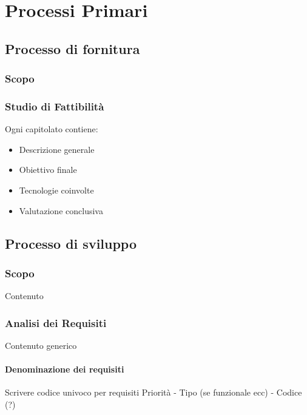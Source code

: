 \section{Processi Primari}\label{PP}

    \subsection{Processo di fornitura}\label{PP:Fornitura}	%

        \subsubsection{Scopo}\label{PP:Fornitura:Scopo}


        \subsubsection{Studio di Fattibilità}\label{PP:Fornitura:SdF} 
        	Ogni capitolato contiene:
        	\begin{itemize}
        		\item Descrizione generale
        		\item Obiettivo finale
        		\item Tecnologie coinvolte
        		\item Valutazione conclusiva
        	\end{itemize}


    \subsection{Processo di sviluppo}\label{PP:Sviluppo}

        \subsubsection{Scopo}\label{PP:Sviluppo:Scopo}
        Contenuto


        \subsubsection{Analisi dei Requisiti}\label{PP:Sviluppo:AdR}
        Contenuto generico
        

		        \paragraph{Denominazione dei requisiti}\label{PP:Sviluppo:AdR:DenominazioneRequisiti}
		        Scrivere codice univoco per requisiti
		        Priorità - Tipo (se funzionale ecc) - Codice (?)
	
